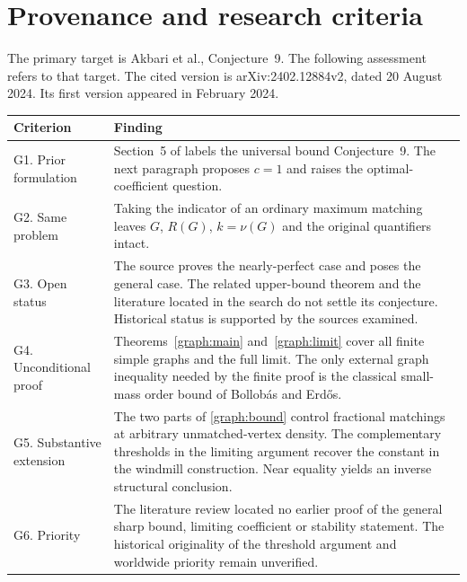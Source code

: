 \documentclass[11pt]{article}
\theoremstyle{remark}\newtheorem{remark}[theorem]{Remark}
\begin{document}
\section{Provenance and research criteria}
\label{sec:status}
The primary target is Akbari et al., Conjecture~9. The following assessment refers to that target. The cited version is arXiv:2402.12884v2, dated 20 August 2024. Its first version appeared in February 2024.
\begin{center}
\small\renewcommand{\arraystretch}{1.23}
\begin{tabularx}{\linewidth}{@{}lX@{}}
\toprule
Criterion & Finding \\
\midrule
G1. Prior formulation & Section~5 of \cite{AGGHT} labels the universal bound Conjecture~9. The next paragraph proposes $c=1$ and raises the optimal-coefficient question. \\
G2. Same problem & Taking the indicator of an ordinary maximum matching leaves $G$, $R(G)$, $k=\nu(G)$ and the original quantifiers intact. \\
G3. Open status & The source proves the nearly-perfect case and poses the general case. The related upper-bound theorem \cite{Liu} and the literature located in the search do not settle its conjecture. Historical status is supported by the sources examined. \\
G4. Unconditional proof & Theorems~\ref{graph:main} and~\ref{graph:limit} cover all finite simple graphs and the full limit. The only external graph inequality needed by the finite proof is the classical small-mass order bound of Bollob\'as and Erd\H{o}s. \\
G5. Substantive extension & The two parts of \eqref{graph:bound} control fractional matchings at arbitrary unmatched-vertex density. The complementary thresholds in the limiting argument recover the constant in the windmill construction. Near equality yields an inverse structural conclusion. \\
G6. Priority & The literature review located no earlier proof of the general sharp bound, limiting coefficient or stability statement. The historical originality of the threshold argument and worldwide priority remain unverified. \\
\bottomrule
\end{tabularx}
\end{center}
\end{document}
